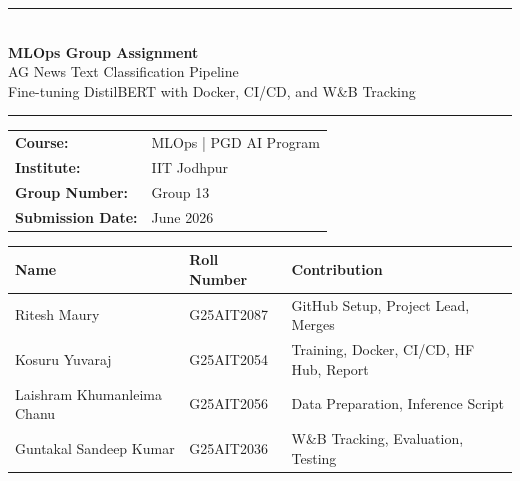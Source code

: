 \documentclass[11pt,a4paper]{article}
\begin{document}
\begin{titlepage}
\centering
\vspace*{2cm}

{\color{darkblue}\rule{\linewidth}{2pt}}\\[0.4cm]
{\LARGE\bfseries\color{darkblue} MLOps Group Assignment}\\[0.3cm]
{\large AG News Text Classification Pipeline}\\[0.2cm]
{\normalsize Fine-tuning DistilBERT with Docker, CI/CD, and W\&B Tracking}\\[0.4cm]
{\color{darkblue}\rule{\linewidth}{2pt}}

\vspace{1.5cm}

\renewcommand{\arraystretch}{1.5}
\begin{tabular}{ll}
\textbf{Course:}         & MLOps | PGD AI Program \\
\textbf{Institute:}      & IIT Jodhpur \\
\textbf{Group Number:}   & Group 13 \\
\textbf{Submission Date:} & June 2026 \\
\end{tabular}

\vspace{1.2cm}

\renewcommand{\arraystretch}{1.4}
\begin{tabular}{lll}
\hline
\textbf{Name} & \textbf{Roll Number} & \textbf{Contribution} \\
\hline
Ritesh Maury               & G25AIT2087 & GitHub Setup, Project Lead, Merges \\
Kosuru Yuvaraj             & G25AIT2054 & Training, Docker, CI/CD, HF Hub, Report \\
Laishram Khumanleima Chanu & G25AIT2056 & Data Preparation, Inference Script \\
Guntakal Sandeep Kumar     & G25AIT2036 & W\&B Tracking, Evaluation, Testing \\
\hline
\end{tabular}

\vspace{1.5cm}


\end{titlepage}
\end{document}

